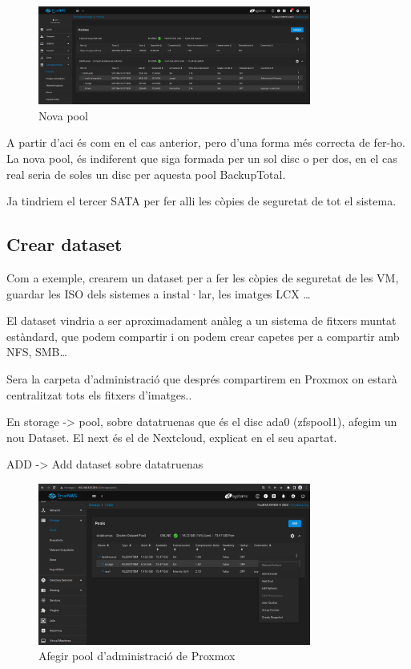 \documentclass[
  10pt,
]{krantz}
\begin{document}
\begin{figure}
\centering
\includegraphics[width=0.8\textwidth,height=\textheight]{imatges/proxmox/nova_pool.png}
\caption{Nova pool}
\end{figure}

A partir d'aci és com en el cas anterior, pero d'una forma més correcta de fer-ho. La nova pool, és indiferent que siga formada per un sol disc o per dos, en el cas real seria de soles un disc per aquesta pool BackupTotal.

Ja tindriem el tercer SATA per fer alli les còpies de seguretat de tot el sistema.

\hypertarget{crear-dataset}{%
\subsection{Crear dataset}\label{crear-dataset}}

Com a exemple, crearem un dataset per a fer les còpies de seguretat de les VM, guardar les ISO dels sistemes a instal·lar, les imatges LCX \ldots{}

El dataset vindria a ser aproximadament anàleg a un sistema de fitxers muntat estàndard, que podem compartir i on podem crear capetes per a compartir amb NFS, SMB\ldots{}

Sera la carpeta d'administració que després compartirem en Proxmox on estarà centralitzat tots els fitxers d'imatges..

En storage -\textgreater{} pool, sobre datatruenas que és el disc ada0 (zfspool1), afegim un nou Dataset. El next és el de Nextcloud, explicat en el seu apartat.

ADD -\textgreater{} Add dataset sobre datatruenas

\begin{figure}
\centering
\includegraphics[width=0.8\textwidth,height=\textheight]{imatges/proxmox/truena_add_pool.png}
\caption{Afegir pool d'administració de Proxmox}
\end{figure}
\end{document}
